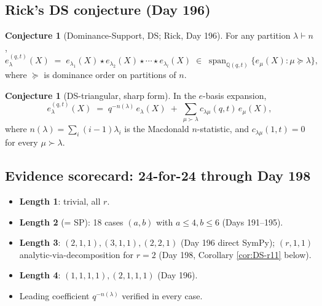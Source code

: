 \documentclass[11pt]{article}
\theoremstyle{definition}
\newtheorem{conjecture}[theorem]{Conjecture}
\begin{document}
\subsection*{Rick's DS conjecture (Day 196)}
\begin{conjecture}[Dominance-Support, DS; Rick, Day 196]\label{conj:DS}
For any partition $\lambda\vdash n$,
\begin{equation}\label{eq:DS}
  e_\lambda^{(q,t)}(X)
    \;=\; e_{\lambda_1}(X)\star e_{\lambda_2}(X)\star\cdots\star e_{\lambda_l}(X)
    \;\in\; \operatorname{span}_{\mathbb Q(q,t)}\bigl\{e_\mu(X):\mu\succeq\lambda\bigr\},
\end{equation}
where $\succeq$ is dominance order on partitions of $n$.
\end{conjecture}

\begin{conjecture}[DS-triangular, sharp form]\label{conj:DS-tri}
In the $e$-basis expansion,
\begin{equation}\label{eq:DS-triangular}
  e_\lambda^{(q,t)}(X) \;=\; q^{-n(\lambda)}\, e_\lambda(X)
    \;+\; \sum_{\mu\succ\lambda} c_{\lambda\mu}(q,t)\, e_\mu(X),
\end{equation}
where $n(\lambda)=\sum_i(i-1)\lambda_i$ is the Macdonald $n$-statistic,
and $c_{\lambda\mu}(1,t)=0$ for every $\mu\succ\lambda$.
\end{conjecture}

\subsection*{Evidence scorecard: 24-for-24 through Day 198}
\begin{itemize}[leftmargin=1.5em]
  \item \textbf{Length 1}: trivial, all $r$.
  \item \textbf{Length 2} (= SP): 18 cases $(a,b)$ with $a\le 4,
        b\le 6$ (Days 191--195).
  \item \textbf{Length 3}: $(2,1,1),(3,1,1),(2,2,1)$ (Day 196
        direct SymPy); $(r,1,1)$ analytic-via-decomposition for $r=2$
        (Day 198, Corollary \ref{cor:DS-r11} below).
  \item \textbf{Length 4}: $(1,1,1,1),(2,1,1,1)$ (Day 196).
  \item Leading coefficient $q^{-n(\lambda)}$ verified in every case.
\end{itemize}
\end{document}
